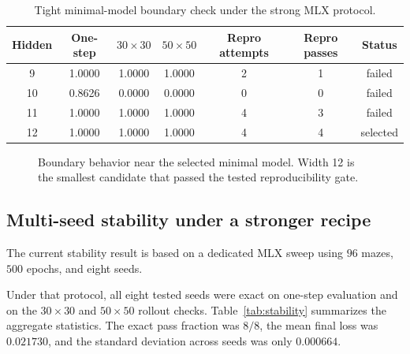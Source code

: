 \documentclass[11pt]{article}
\begin{document}
\begin{table}[t]
\centering
\caption{Tight minimal-model boundary check under the strong MLX protocol.}
\begin{tabular}{ccccccc}
\toprule
Hidden & One-step & \(30\times 30\) & \(50\times 50\) & Repro attempts & Repro passes & Status \\
\midrule
9  & 1.0000 & 1.0000 & 1.0000 & 2 & 1 & failed \\
10 & 0.8626 & 0.0000 & 0.0000 & 0 & 0 & failed \\
11 & 1.0000 & 1.0000 & 1.0000 & 4 & 3 & failed \\
12 & 1.0000 & 1.0000 & 1.0000 & 4 & 4 & selected \\
\bottomrule
\end{tabular}
\label{tab:minimal}
\end{table}

\begin{figure}[t]
\centering
{}
\caption{Boundary behavior near the selected minimal model. Width 12 is the smallest candidate that passed the tested reproducibility gate.}
\label{fig:minimal}
\end{figure}

\subsection{Multi-seed stability under a stronger recipe}
The current stability result is based on a dedicated MLX sweep using \(96\) mazes, \(500\) epochs, and eight seeds.

Under that protocol, all eight tested seeds were exact on one-step evaluation and on the \(30\times 30\) and \(50\times 50\) rollout checks. Table~\ref{tab:stability} summarizes the aggregate statistics. The exact pass fraction was \(8/8\), the mean final loss was \(0.021730\), and the standard deviation across seeds was only \(0.000664\).
\end{document}
